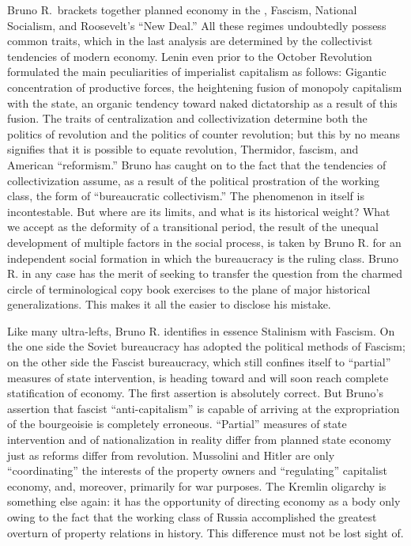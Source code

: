Bruno R.\ brackets together planned economy in the \USSR, Fascism, National Socialism, and Roosevelt’s “New Deal.” All these regimes undoubtedly possess common traits, which in the last analysis are determined by the collectivist tendencies of modern economy. Lenin even prior to the October Revolution formulated the main peculiarities of imperialist capitalism as follows: Gigantic concentration of productive forces, the heightening fusion of monopoly capitalism with the state, an organic tendency toward naked dictatorship as a result of this fusion. The traits of centralization and collectivization determine both the politics of revolution and the politics of counter revolution; but this by no means signifies that it is possible to equate revolution, Thermidor, fascism, and American “reformism.” Bruno has caught on to the fact that the tendencies of collectivization assume, as a result of the political prostration of the working class, the form of “bureaucratic collectivism.” The phenomenon in itself is incontestable. But where are its limits, and what is its historical weight? What we accept as the deformity of a transitional period, the result of the unequal development of multiple factors in the social process, is taken by Bruno R. for an independent social formation in which the bureaucracy is the ruling class. Bruno R. in any case has the merit of seeking to transfer the question from the charmed circle of terminological copy book exercises to the plane of major historical generalizations. This makes it all the easier to disclose his mistake.

Like many ultra-lefts, Bruno R. identifies in essence Stalinism with Fascism. On the one side the Soviet bureaucracy has adopted the political methods of Fascism; on the other side the Fascist bureaucracy, which still confines itself to “partial” measures of state intervention, is heading toward and will soon reach complete statification of economy. The first assertion is absolutely correct. But Bruno’s assertion that fascist “anti-capitalism” is capable of arriving at the expropriation of the bourgeoisie is completely erroneous. “Partial” measures of state intervention and of nationalization in reality differ from planned state economy just as reforms differ from revolution. Mussolini and Hitler are only “coordinating” the interests of the property owners and “regulating” capitalist economy, and, moreover, primarily for war purposes. The Kremlin oligarchy is something else again: it has the opportunity of directing economy as a body only owing to the fact that the working class of Russia accomplished the greatest overturn of property relations in history. This difference must not be lost sight of.

